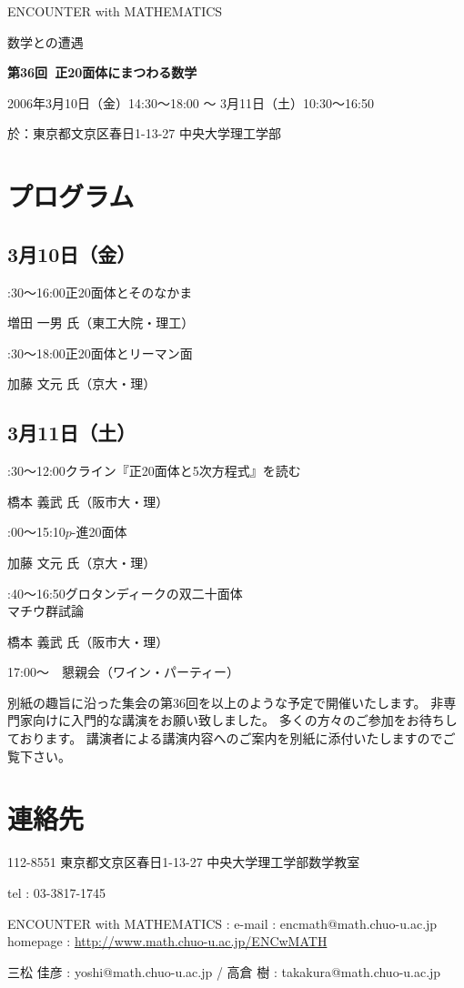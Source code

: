 \documentclass[uplatex,dvipdfmx]{jlreq}
\newcommand{\talk}[3]{%
\noindent
#1\quad #2\par
\hspace*{2em}#3\par\smallskip
}
\newcommand{\EwMnumber}{第36回}
\newcommand{\EwMtitle}{正20面体にまつわる数学}
\newcommand{\EwMdate}{2006年3月10日（金）14:30～18:00 ～ 3月11日（土）10:30～16:50}
\newcommand{\EwMplace}{東京都文京区春日1-13-27 中央大学理工学部}
\newcommand{\EwMtitleblock}{

\vspace*{-5mm}

\begin{center}

{\Large ENCOUNTER with MATHEMATICS}

\vspace{2mm}

{\large 数学との遭遇}

\vspace{4mm}

{\Large \bfseries \EwMnumber\ \EwMtitle}

\vspace{4mm}

\EwMdate

\vspace{2mm}

於：\EwMplace

\end{center}

\vspace{2mm}

}
\begin{document}
\EwMtitleblock


\section*{プログラム}

\subsection*{3月10日（金）}

\talk
{14:30～16:00}
{正20面体とそのなかま}
{増田 一男 氏（東工大院・理工）}

\talk
{16:30～18:00}
{正20面体とリーマン面}
{加藤 文元 氏（京大・理）}

\subsection*{3月11日（土）}

\talk
{10:30～12:00}
{クライン『正20面体と5次方程式』を読む}
{橋本 義武 氏（阪市大・理）}

\talk
{14:00～15:10}
{$p$-進20面体}
{加藤 文元 氏（京大・理）}

\talk
{15:40～16:50}
{グロタンディークの双二十面体\\[1mm]マチウ群試論}
{橋本 義武 氏（阪市大・理）}

\bigskip

17:00～　懇親会（ワイン・パーティー）


\bigskip

別紙の趣旨に沿った集会の第36回を以上のような予定で開催いたします。  
非専門家向けに入門的な講演をお願い致しました。  
多くの方々のご参加をお待ちしております。  
講演者による講演内容へのご案内を別紙に添付いたしますのでご覧下さい。


\section*{連絡先}

112-8551 東京都文京区春日1-13-27 中央大学理工学部数学教室 

tel : 03-3817-1745  

ENCOUNTER with MATHEMATICS : e-mail : encmath@math.chuo-u.ac.jp  
homepage : \url{http://www.math.chuo-u.ac.jp/ENCwMATH}  

三松 佳彦 : yoshi@math.chuo-u.ac.jp / 高倉 樹 : takakura@math.chuo-u.ac.jp
\end{document}
